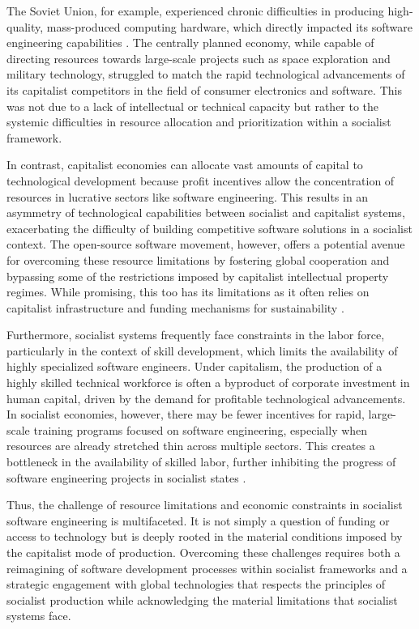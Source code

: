\begin{refsection}
The Soviet Union, for example, experienced chronic difficulties in producing high-quality, mass-produced computing hardware, which directly impacted its software engineering capabilities \cite[pp.~200-203]{nove}. The centrally planned economy, while capable of directing resources towards large-scale projects such as space exploration and military technology, struggled to match the rapid technological advancements of its capitalist competitors in the field of consumer electronics and software. This was not due to a lack of intellectual or technical capacity but rather to the systemic difficulties in resource allocation and prioritization within a socialist framework.

In contrast, capitalist economies can allocate vast amounts of capital to technological development because profit incentives allow the concentration of resources in lucrative sectors like software engineering. This results in an asymmetry of technological capabilities between socialist and capitalist systems, exacerbating the difficulty of building competitive software solutions in a socialist context. The open-source software movement, however, offers a potential avenue for overcoming these resource limitations by fostering global cooperation and bypassing some of the restrictions imposed by capitalist intellectual property regimes. While promising, this too has its limitations as it often relies on capitalist infrastructure and funding mechanisms for sustainability \cite[pp.~45-50]{stallman}.

Furthermore, socialist systems frequently face constraints in the labor force, particularly in the context of skill development, which limits the availability of highly specialized software engineers. Under capitalism, the production of a highly skilled technical workforce is often a byproduct of corporate investment in human capital, driven by the demand for profitable technological advancements. In socialist economies, however, there may be fewer incentives for rapid, large-scale training programs focused on software engineering, especially when resources are already stretched thin across multiple sectors. This creates a bottleneck in the availability of skilled labor, further inhibiting the progress of software engineering projects in socialist states \cite[pp.~305-308]{braverman}.

Thus, the challenge of resource limitations and economic constraints in socialist software engineering is multifaceted. It is not simply a question of funding or access to technology but is deeply rooted in the material conditions imposed by the capitalist mode of production. Overcoming these challenges requires both a reimagining of software development processes within socialist frameworks and a strategic engagement with global technologies that respects the principles of socialist production while acknowledging the material limitations that socialist systems face.


\end{refsection}
